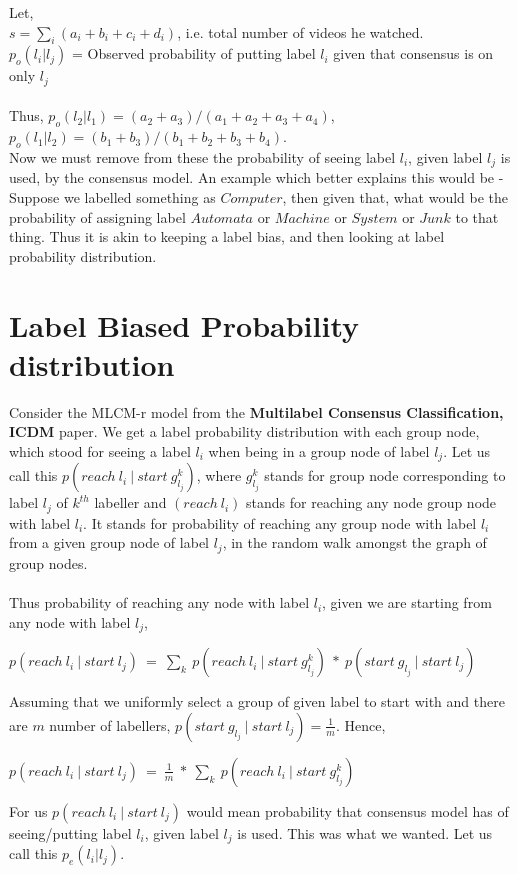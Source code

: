 \documentclass[twoside]{article}
\begin{document}
Let,\\ $s = \sum_i(a_i+b_i+c_i+d_i)$, i.e. total number of videos he watched.  \\
$p_o(l_i|l_j)$ = Observed probability of putting label $l_i$ given that consensus is on only $l_j$ \\\\
Thus, $p_o(l_2|l_1) = (a_2 + a_3)/(a_1 + a_2 + a_3 + a_4)$, $p_o(l_1|l_2) = (b_1 + b_3)/(b_1 + b_2 + b_3 + b_4)$. \\
Now we must remove from these the probability of seeing label $l_i$, given label $l_j$ is used, by the consensus model. An example which better explains this would be - Suppose we labelled something as $Computer$, then given that, what would be the probability of assigning label $Automata$ or $Machine$ or $System$ or $Junk$ to that thing. Thus it is akin to keeping a label bias, and then looking at label probability distribution.  

\section{Label Biased Probability distribution}
Consider the MLCM-r model from the \textbf{Multilabel Consensus Classification, ICDM} paper. We get a label probability distribution with each group node, which stood for seeing a label $l_i$ when being in a group node of label $l_j$. Let us call this $p(reach\ l_i\ |\ start\ g_{l_j}^k)$, where $g^k_{l_j}$ stands for group node corresponding to label $l_j$ of $k^{th}$ labeller and $(reach\ l_i)$ stands for reaching any node group node with label $l_i$. It stands for probability of reaching any group node with label $l_i$ from a given group node of label $l_j$, in the random walk amongst the graph of group nodes. \\\\
Thus probability of reaching any node with label $l_i$, given we are starting from any node with label $l_j$, 
\begin{center}
$p(reach\ l_i\ |\ start\ l_j)\ =\  \sum_k\ p(reach\ l_i\ |\ start\ g_{l_j}^k)\ *\ p(start\ g_{l_j}\ |\ start\ l_j)$ 
\end{center}
Assuming that we uniformly select a group of given label to start with and there are $m$ number of labellers, $p(start\ g_{l_j}\ |\ start\ l_j) = \frac{1}{m}$. Hence,

\begin{center}
$p(reach\ l_i\ |\ start\ l_j)\ =\  \frac{1}{m}\ *\ \sum_k\ p(reach\ l_i\ |\ start\ g_{l_j}^k)$
\end{center}
For us $p(reach\ l_i\ |\ start\ l_j)$ would mean probability that consensus model has of seeing/putting label $l_i$, given label $l_j$ is used. This was what we wanted. Let us call this $p_e(l_i|l_j)$.
\end{document}
